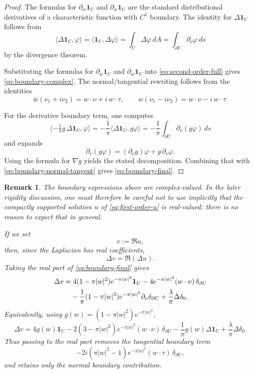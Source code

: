 \documentclass[11pt]{article}
\newtheorem{remark}[theorem]{Remark}
\newcommand{\1}{\mathbf 1}
\newcommand{\pw}{\partial_w}
\newcommand{\pwb}{\partial_{\bar w}}
\begin{document}
\begin{proof}
The formulas for \(\pw \1_U\) and \(\pwb \1_U\) are the standard distributional derivatives of a
characteristic function with \(C^1\) boundary. The identity for \(\Delta \1_U\) follows from
\[
\langle \Delta \1_U,\varphi\rangle
=
\langle \1_U,\Delta \varphi\rangle
=
\int_U \Delta \varphi\,dA
=
\int_{\partial U}\partial_\nu\varphi\,ds
\]
by the divergence theorem.

Substituting the formulas for \(\pw \1_U\) and \(\pwb \1_U\) into
\eqref{eq:second-order-full} gives \eqref{eq:boundary-complex}. The normal/tangential rewriting
follows from the identities
\[
\bar w(\nu_1+i\nu_2)=w\cdot \nu+i\,w\cdot \tau,
\qquad
w(\nu_1-i\nu_2)=w\cdot \nu-i\,w\cdot \tau.
\]

For the derivative boundary term, one computes
\[
\langle -\tfrac1\pi g\,\Delta \1_U,\varphi\rangle
=
-\frac1\pi\langle \Delta \1_U,g\varphi\rangle
=
-\frac1\pi\int_{\partial U}\partial_\nu(g\varphi)\,ds
\]
and expands
\[
\partial_\nu(g\varphi)=(\partial_\nu g)\varphi+g\,\partial_\nu\varphi.
\]
Using the formula for \(\nabla g\) yields the stated decomposition. Combining that with
\eqref{eq:boundary-normal-tangent} gives \eqref{eq:boundary-final}.
\end{proof}

\begin{remark}\label{rem:real-part}
The boundary expressions above are complex-valued. In the later rigidity discussion, one must
therefore be careful not to use implicitly that the compactly supported solution \(u\) of
\eqref{eq:first-order-u} is real-valued: there is no reason to expect that in general.

If we set
\[
v:=\Re u,
\]
then, since the Laplacian has real coefficients,
\[
\Delta v=\Re(\Delta u).
\]
Taking the real part of \eqref{eq:boundary-final} gives
\begin{align}
\Delta v
&=
4(1-\pi|w|^2)e^{-\pi|w|^2}\1_U
-4e^{-\pi|w|^2}(w\cdot \nu)\,\delta_{\partial U} \notag\\
&\quad
-\frac1\pi(1-\pi|w|^2)e^{-\pi|w|^2}\partial_\nu\delta_{\partial U}
+\frac{\lambda}{\pi}\Delta\delta_0. \label{eq:real-part-laplacian}
\end{align}
Equivalently, using \(g(w)=(1-\pi|w|^2)e^{-\pi|w|^2}\),
\begin{equation}\label{eq:real-part-laplacian-g}
\Delta v
=
4g(w)\1_U
-2(3-\pi|w|^2)e^{-\pi|w|^2}(w\cdot \nu)\,\delta_{\partial U}
-\frac1\pi g(w)\Delta \1_U
+\frac{\lambda}{\pi}\Delta\delta_0.
\end{equation}
Thus passing to the real part removes the tangential boundary term
\[
-2i(\pi|w|^2-1)e^{-\pi|w|^2}(w\cdot \tau)\,\delta_{\partial U},
\]
and retains only the normal boundary contribution.
\end{remark}
\end{document}
